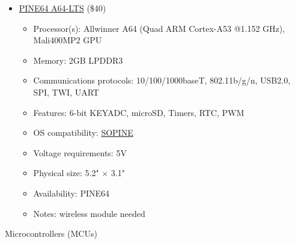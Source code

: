 \begin{itemize}
    \item
    \href{https://www.pine64.org/devices/single-board-computers/pine-a64-lts/}{PINE64 A64-LTS}
    (\$40)
    \begin{itemize}
        \item Processor(s): Allwinner A64 (Quad ARM Cortex-A53 @1.152 GHz), Mali400MP2 GPU
        \item Memory: 2GB LPDDR3
        \item Communications protocols: 10/100/1000baseT, 802.11b/g/n, USB2.0, SPI, TWI, UART 
        \item Features: 6-bit KEYADC, microSD, Timers, RTC, PWM
        \item OS compatibility: \href{https://wiki.pine64.org/wiki/SOPINE_Software_Release}{SOPINE}
        \item Voltage requirements: 5V
        \item Physical size: 5.2" $\times$ 3.1"
        \item Availability: PINE64
        \item Notes: wireless module needed
    \end{itemize}
\end{itemize}
Microcontrollers (MCUs)
